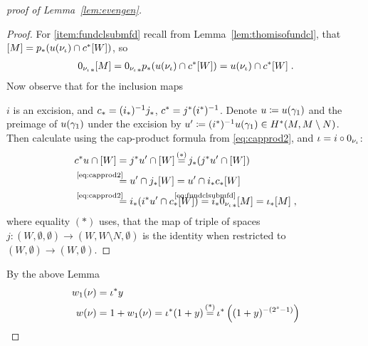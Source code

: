 \begin{proof}[proof of
  Lemma~\ref{lem:evengen}]
\begin{Lem}
\begin{proof}
      For \ref{item:fundclsubmfd} recall from
      Lemma~\ref{lem:thomisofundcl}, that 
      $[M] = {p}_*({u}(\nu_{{\iota}}) \cap {c}^*[W])$,
      so
      \begin{gather}\label{eq:fundclsubmfd}
        {0_{\nu_{{\iota}}}}_*[M]
        = {0_{\nu_{{\iota}}}}_*{p}_*
        ({u}(\nu_{{\iota}}) \cap {c}^*[W])
        = {u}(\nu_{{\iota}}) \cap {c}^*[W]
        \;.
      \end{gather}
      Now observe that for the inclusion maps
      \begin{center}
      \end{center}
      $i$ is an excision, and 
      ${c}_* = ({i}_*)^{-1} {j}_*$, ${c}^*= {j}^*({i}^*)^{-1}$.
      Denote $u\coloneqq {u}(\gamma_1)$ and the preimage of
      ${u}(\gamma_1)$ under the excision by
      $u'\coloneqq ({i}^*)^{-1}{u}(\gamma_1)\in H^*(M, M\setminus N)$.
      Then calculate using the cap-product formula from
      \autoref{eq:capprod2},
      and ${\iota}=i\circ0_{\nu_{{\iota}}}$:
      \begin{align*}
        \pb\collapse u \cap \fundcl W
        &=\pb j u' \cap \fundcl W
        \cequalsby{$(*)$}
          \pf j(\pb j u' \cap \fundcl W) \\
        &\equalsby{\eqref{eq:capprod2}}
          u' \cap \pf j\fundcl W 
          = u' \cap \pf i\pf c\fundcl W \\
        &\equalsby{\eqref{eq:capprod2}}
          \pf i(\pb i u' \cap \pf c\fundcl W)
        \cequalsby{\eqref{eq:fundclsubmfd}}
          \pf i\pf{\zerosec{\N{\emb}}}\fundcl M
          = \pf\emb \fundcl M
          \;,
      \end{align*}
      where equality $(*)$ uses, that the map of triple of spaces
      $j\colon (W, \emptyset, \emptyset)\to(W, W\setminus N, \emptyset)$
      is the identity when restricted to $(W,\emptyset)\to(W, \emptyset)$.
    \end{proof}
  \end{Lem}
  By the above Lemma
  \begin{align*}
    \w1{\N{}}
    &= \pb\emb y \\
    \W{\N{}}
    &= 1 + \w1{\N{}}
      = \pb\emb(1+y)
      \cequalsby{(*)} \pb\emb\left((1+y)^{-(2^s-1)}\right)

\end{align*}
\end{proof}

